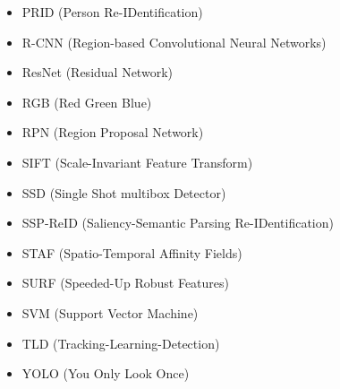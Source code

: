 \begin{itemize}
	\item PRID (Person Re-IDentification)
	\item R-CNN (Region-based Convolutional Neural Networks)
	\item ResNet (Residual Network)
	\item RGB (Red Green Blue)
	\item RPN (Region Proposal Network)
	\item SIFT (Scale-Invariant Feature Transform)
	\item SSD (Single Shot multibox Detector)
	\item SSP-ReID (Saliency-Semantic Parsing Re-IDentification)
	\item STAF (Spatio-Temporal Affinity Fields)
	\item SURF (Speeded-Up Robust Features)
	\item SVM (Support Vector Machine)
	\item TLD (Tracking-Learning-Detection)
	\item YOLO (You Only Look Once)
\end{itemize}
\clearpage


{}
\listoffigures

